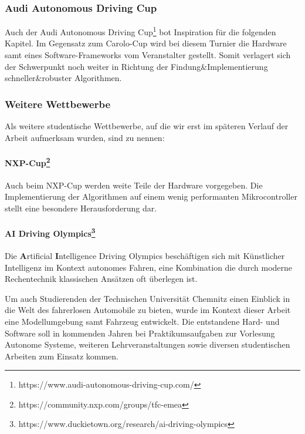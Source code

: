 \subsubsection{Audi Autonomous Driving Cup}
Auch der Audi Autonomous Driving Cup\footnote{https://www.audi-autonomous-driving-cup.com/} bot Inspiration für die folgenden Kapitel. Im Gegensatz zum Carolo-Cup wird bei diesem Turnier die Hardware samt eines Software-Frameworks vom Veranstalter gestellt. Somit verlagert sich der Schwerpunkt noch weiter in Richtung der Findung\&Implementierung schneller\&robuster Algorithmen. 

\subsubsection{Weitere Wettbewerbe}
Als weitere studentische Wettbewerbe, auf die wir erst im späteren Verlauf der Arbeit aufmerksam wurden, sind zu nennen:
\paragraph{NXP-Cup\footnote{https://community.nxp.com/groups/tfc-emea}}
Auch beim NXP-Cup werden weite Teile der Hardware vorgegeben. Die Implementierung der Algorithmen auf einem wenig performanten Mikrocontroller stellt eine besondere Herausforderung dar. 
\paragraph{AI Driving Olympics\footnote{https://www.duckietown.org/research/ai-driving-olympics}}
Die \textbf{A}rtificial \textbf{I}ntelligence Driving Olympics beschäftigen sich mit Künstlicher Intelligenz im Kontext autonomes Fahren, eine Kombination die durch moderne Rechentechnik klassischen Ansätzen oft überlegen ist. 

Um auch Studierenden der Technischen Universität Chemnitz einen Einblick in die Welt des fahrerlosen Automobile zu bieten, wurde im Kontext dieser Arbeit eine Modellumgebung samt Fahrzeug entwickelt. Die entstandene Hard- und Software soll in kommenden Jahren bei Praktikumsaufgaben zur Vorlesung \glqq Autonome Systeme\grqq{}, weiteren Lehrveranstaltungen sowie diversen studentischen Arbeiten zum Einsatz kommen. 


